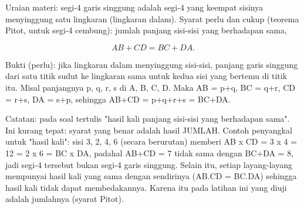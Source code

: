 \documentclass[a4paper,10pt]{article}
\begin{document}
\begin{eulernotebook}
\begin{eulercomment}
\begin{eulercomment}
\begin{eulercomment}
\begin{eulercomment}
\begin{eulercomment}
\begin{eulercomment}
\begin{eulercomment}
\begin{eulercomment}
\begin{eulercomment}
\begin{eulercomment}
\begin{eulercomment}
\begin{eulercomment}
\begin{eulercomment}
\begin{eulercomment}
\begin{eulercomment}
\begin{eulercomment}
\begin{eulercomment}
\begin{eulercomment}
\begin{eulercomment}
\begin{eulercomment}
\begin{eulercomment}
\end{eulercomment}
\begin{eulercomment}
Uraian materi: segi-4 garis singgung adalah segi-4 yang keempat sisinya menyinggung satu
lingkaran (lingkaran dalam). Syarat perlu dan cukup (teorema Pitot, untuk segi-4 cembung):
jumlah panjang sisi-sisi yang berhadapan sama,
\end{eulercomment}
\begin{eulerformula}
\[
AB + CD = BC + DA.
\]
\end{eulerformula}
\begin{eulercomment}
Bukti (perlu): jika lingkaran dalam menyinggung sisi-sisi, panjang garis singgung dari satu titik
sudut ke lingkaran sama untuk kedua sisi yang bertemu di titik itu. Misal panjangnya p, q, r, s
di A, B, C, D. Maka AB = p+q, BC = q+r, CD = r+s, DA = s+p, sehingga AB+CD = p+q+r+s = BC+DA.

Catatan: pada soal tertulis "hasil kali panjang sisi-sisi yang berhadapan sama". Ini kurang tepat:
syarat yang benar adalah hasil JUMLAH. Contoh penyangkal untuk "hasil kali": sisi 3, 2, 4, 6 (secara
berurutan) memberi AB x CD = 3 x 4 = 12 = 2 x 6 = BC x DA, padahal AB+CD = 7 tidak sama dengan BC+DA = 8, jadi
segi-4 tersebut bukan segi-4 garis singgung. Selain itu, setiap layang-layang mempunyai hasil kali
yang sama dengan sendirinya (AB.CD = BC.DA) sehingga hasil kali tidak dapat membedakannya.
Karena itu pada latihan ini yang diuji adalah jumlahnya (syarat Pitot).


\end{eulercomment}
\end{eulercomment}
\end{eulercomment}
\end{eulercomment}
\end{eulercomment}
\end{eulercomment}
\end{eulercomment}
\end{eulercomment}
\end{eulercomment}
\end{eulercomment}
\end{eulercomment}
\end{eulercomment}
\end{eulercomment}
\end{eulercomment}
\end{eulercomment}
\end{eulercomment}
\end{eulercomment}
\end{eulercomment}
\end{eulercomment}
\end{eulercomment}
\end{eulercomment}
\end{eulernotebook}
\end{document}
